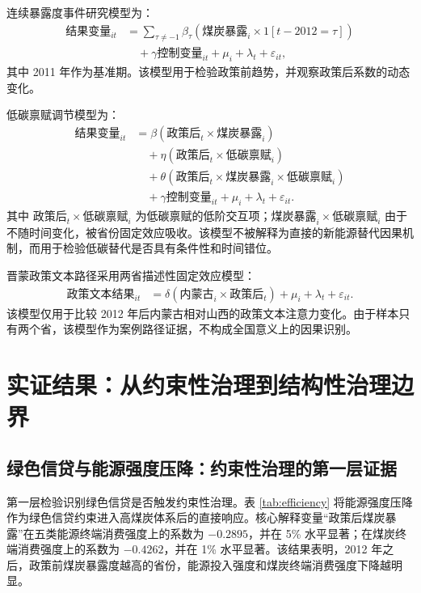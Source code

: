 \documentclass[UTF8,12pt]{ctexart}
\begin{document}
连续暴露度事件研究模型为：
\[
    \begin{aligned}
    \text{结果变量}_{it}
    &= \sum_{\tau \neq -1}\beta_{\tau}
    \left(\text{煤炭暴露}_{i} \times 1[t-2012=\tau]\right) \\
    &\quad + \gamma \text{控制变量}_{it}
    + \mu_i + \lambda_t + \varepsilon_{it},
    \end{aligned}
\]
其中 2011 年作为基准期。该模型用于检验政策前趋势，并观察政策后系数的动态变化。

低碳禀赋调节模型为：
\[
    \begin{aligned}
    \text{结果变量}_{it}
    &= \beta \left(\text{政策后}_{t} \times \text{煤炭暴露}_{i}\right) \\
    &\quad + \eta \left(\text{政策后}_{t} \times \text{低碳禀赋}_{i}\right) \\
    &\quad + \theta \left(\text{政策后}_{t} \times \text{煤炭暴露}_{i}
    \times \text{低碳禀赋}_{i}\right) \\
    &\quad + \gamma \text{控制变量}_{it}
    + \mu_i + \lambda_t + \varepsilon_{it}.
    \end{aligned}
\]
其中 $\text{政策后}_{t} \times \text{低碳禀赋}_{i}$ 为低碳禀赋的低阶交互项；$\text{煤炭暴露}_{i} \times \text{低碳禀赋}_{i}$ 由于不随时间变化，被省份固定效应吸收。该模型不被解释为直接的新能源替代因果机制，而用于检验低碳替代是否具有条件性和时间错位。

晋蒙政策文本路径采用两省描述性固定效应模型：
\[
    \begin{aligned}
    \text{政策文本结果}_{it}
    &= \delta (\text{内蒙古}_{i} \times \text{政策后}_{t})
    + \mu_i + \lambda_t + \varepsilon_{it}.
    \end{aligned}
\]
该模型仅用于比较 2012 年后内蒙古相对山西的政策文本注意力变化。由于样本只有两个省，该模型作为案例路径证据，不构成全国意义上的因果识别。

\section{实证结果：从约束性治理到结构性治理边界}

\subsection{绿色信贷与能源强度压降：约束性治理的第一层证据}

第一层检验识别绿色信贷是否触发约束性治理。表 \ref{tab:efficiency} 将能源强度压降作为绿色信贷约束进入高煤炭体系后的直接响应。核心解释变量“政策后煤炭暴露”在五类能源终端消费强度上的系数为 $-0.2895$，并在 5\% 水平显著；在煤炭终端消费强度上的系数为 $-0.4262$，并在 1\% 水平显著。该结果表明，2012 年之后，政策前煤炭暴露度越高的省份，能源投入强度和煤炭终端消费强度下降越明显。
\end{document}

